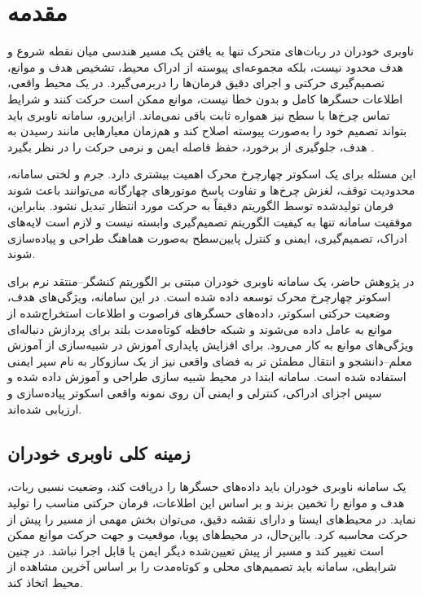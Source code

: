 \chapter{مقدمه}

ناوبری خودران در ربات‌های متحرک تنها به یافتن یک مسیر هندسی میان نقطه شروع و هدف محدود نیست، بلکه مجموعه‌ای پیوسته از ادراک محیط، تشخیص هدف و موانع، تصمیم‌گیری حرکتی و اجرای دقیق فرمان‌ها را دربرمی‌گیرد. در یک محیط واقعی، اطلاعات حسگرها کامل و بدون خطا نیست، موانع ممکن است حرکت کنند و شرایط تماس چرخ‌ها با سطح نیز همواره ثابت باقی نمی‌ماند. ازاین‌رو، سامانه ناوبری باید بتواند تصمیم خود را به‌صورت پیوسته اصلاح کند و هم‌زمان معیارهایی مانند رسیدن به هدف، جلوگیری از برخورد، حفظ فاصله ایمن و نرمی حرکت را در نظر بگیرد \cite{Zhu2021,s25113394}.

این مسئله برای یک اسکوتر چهارچرخ محرک اهمیت بیشتری دارد. جرم و لختی سامانه، محدودیت توقف، لغزش چرخ‌ها و تفاوت پاسخ موتورهای چهارگانه می‌توانند باعث شوند فرمان تولیدشده توسط الگوریتم دقیقاً به حرکت مورد انتظار تبدیل نشود. بنابراین، موفقیت سامانه تنها به کیفیت الگوریتم تصمیم‌گیری وابسته نیست و لازم است لایه‌های ادراک، تصمیم‌گیری، ایمنی و کنترل پایین‌سطح به‌صورت هماهنگ طراحی و پیاده‌سازی شوند.

در پژوهش حاضر، یک سامانه ناوبری خودران مبتنی بر الگوریتم کنشگر--منتقد نرم%
 برای اسکوتر چهارچرخ محرک توسعه داده شده است. در این سامانه، ویژگی‌های هدف، وضعیت حرکتی اسکوتر، داده‌های حسگرهای فراصوت و اطلاعات استخراج‌شده از موانع به عامل داده می‌شوند و شبکه حافظه کوتاه‌مدت بلند%
 برای پردازش دنباله‌ای ویژگی‌های موانع به کار می‌رود. برای افزایش پایداری آموزش در شبیه‌سازی از آموزش معلم--دانشجو و انتقال مطمئن تر به فضای واقعی نیز از یک سازوکار به نام سپر ایمنی استفاده شده است. سامانه ابتدا در محیط شبیه سازی طراحی و آموزش داده شده و سپس اجزای ادراکی، کنترلی و ایمنی آن روی نمونه واقعی اسکوتر پیاده‌سازی و ارزیابی شده‌اند.

\section{زمینه کلی ناوبری خودران}

یک سامانه ناوبری خودران باید داده‌های حسگرها را دریافت کند، وضعیت نسبی ربات، هدف و موانع را تخمین بزند و بر اساس این اطلاعات، فرمان حرکتی مناسب را تولید نماید. در محیط‌های ایستا و دارای نقشه دقیق، می‌توان بخش مهمی از مسیر را پیش از حرکت محاسبه کرد. بااین‌حال، در محیط‌های پویا، موقعیت و جهت حرکت موانع ممکن است تغییر کند و مسیر از پیش تعیین‌شده دیگر ایمن یا قابل اجرا نباشد. در چنین شرایطی، سامانه باید تصمیم‌های محلی و کوتاه‌مدت را بر اساس آخرین مشاهده از محیط اتخاذ کند.

